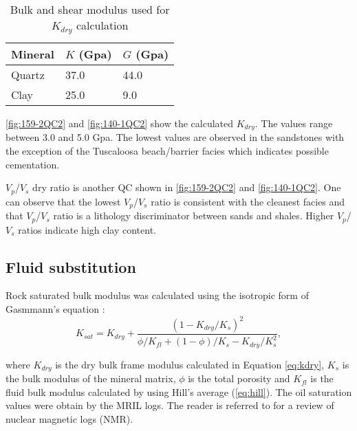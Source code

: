 \begin{table}[h!]
\caption{ Bulk and shear modulus used for $K_{dry}$ calculation \label{tab:moduli}}
\begin{center}
\begin{tabular}{ | l | l |l|}
\hline
Mineral      & $K$ (Gpa) & $G$ (Gpa)  \\
\hline
Quartz & 37.0 & 44.0 \\
\hline
Clay & 25.0 &9.0 \\
\hline
\end{tabular}
\end{center}
\end{table}


\ref{fig:159-2QC2} and \ref{fig:140-1QC2} show the calculated $K_{dry}$. The values
range between 3.0 and 5.0 Gpa. The lowest values are observed in the sandstones
with the exception of the Tuscaloosa beach/barrier facies which indicates
 possible cementation.



$V_{p}$/$V_{s}$ dry ratio is another QC shown in \ref{fig:159-2QC2} and \ref{fig:140-1QC2}. One can observe that the 
lowest $V_{p}$/$V_{s}$ ratio is consistent with the cleanest facies and that  
$V_{p}$/$V_{s}$ ratio is a lithology discriminator between sands and shales. Higher 
$V_{p}$/$V_{s}$ ratios indicate high clay content. 

\newpage
\subsection{Fluid substitution}

Rock saturated bulk modulus was calculated using the isotropic form of Gasmmann's equation 
\citep{ref:gasmmann}:
\begin{equation}
K_{sat}= K_{dry}+\frac{(1-K_{dry}/K_{s})^{2}}{\phi/K_{fl}+(1-\phi)/K_{s}-K_{dry}/K_{s}^2},
  \label{eq:gasmmann}
\end{equation}

where $K_{dry}$ is the dry bulk frame modulus calculated in Equation \ref{eq:kdry}, $K_{s}$ 
is the bulk modulus of the mineral matrix, $\phi$ is the total porosity and $K_{fl}$ is 
the fluid bulk modulus calculated by using Hill's average (\ref{eq:hill}). The oil saturation
values were obtain by the MRIL logs. The reader is referred to \cite{ref:george} for
a review of nuclear magnetic logs (NMR).

